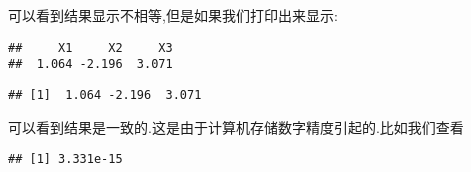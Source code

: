 \documentclass[]{ctexbook}
\newenvironment{Shaded}{\begin{snugshade}}{\end{snugshade}}
\newcommand{\DataTypeTok}[1]{\textcolor[rgb]{0.13,0.29,0.53}{#1}}
\newcommand{\DecValTok}[1]{\textcolor[rgb]{0.00,0.00,0.81}{#1}}
\newcommand{\KeywordTok}[1]{\textcolor[rgb]{0.13,0.29,0.53}{\textbf{#1}}}
\newcommand{\NormalTok}[1]{#1}
\newcommand{\OperatorTok}[1]{\textcolor[rgb]{0.81,0.36,0.00}{\textbf{#1}}}
\begin{document}
可以看到结果显示不相等,但是如果我们打印出来显示:

\begin{Shaded}
\end{Shaded}

\begin{verbatim}
##     X1     X2     X3 
##  1.064 -2.196  3.071
\end{verbatim}

\begin{Shaded}
\end{Shaded}

\begin{verbatim}
## [1]  1.064 -2.196  3.071
\end{verbatim}

可以看到结果是一致的.这是由于计算机存储数字精度引起的.比如我们查看

\begin{Shaded}
\end{Shaded}

\begin{verbatim}
## [1] 3.331e-15
\end{verbatim}
\end{document}
